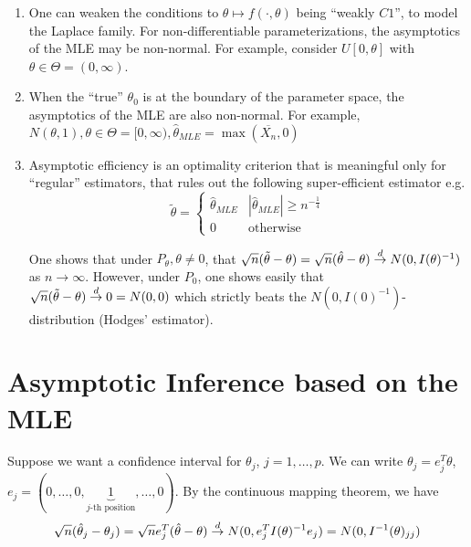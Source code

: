 
\begin{remark}
  \begin{enumerate}
  \item One can weaken the conditions to $\theta \mapsto f(\cdot,
    \theta)$ being ``weakly $C1$'', to model the Laplace family. For
    non-differentiable parameterizations, the asymptotics of the MLE
    may be non-normal. For example, consider $U[0, \theta]$ with
    $\theta \in \Theta = (0, \infty)$.
  \item When the ``true'' $\theta_{0}$ is at the boundary of the
    parameter space, the asymptotics of the MLE are also non-normal.
    For example, $N(\theta, 1), \theta \in \Theta = [0, \infty), \hat
    \theta_{MLE} = \max(\overline{X_{n}}, 0)$
  \item Asymptotic efficiency is an optimality criterion that is
    meaningful only for ``regular'' estimators, that rules out the
    following super-efficient estimator e.g.
    \begin{equation}
      \label{eq:67}
      \tilde \theta =
      \begin{cases}
        \hat \theta_{MLE} & |\hat \theta_{MLE}| \geq n^{-\frac{1}{4}} \\
        0 & \text{otherwise}
      \end{cases}
    \end{equation}

    One shows that under $P_{\theta}, \theta \neq 0$, that
    $\sqrt{n}(\tilde \theta - \theta) = \sqrt{n}(\hat \theta -
    \theta) \overset{d}{\rightarrow} N(0, I(\theta)^{-1})$ as $n \rightarrow \infty$.
    However, under $P_{0}$, one shows easily that $\sqrt{n}(\tilde
    \theta - \theta) \overset{d}{\rightarrow} 0 = N(0, 0)$ which strictly beats the $N(0,
    I(0)^{-1})$-distribution (Hodges' estimator).
  \end{enumerate}
\end{remark}


\section{Asymptotic Inference based on the MLE}
\label{sec:asmpt-infer-based}

Suppose we want a confidence interval for $\theta_{j}$, $j = 1, \dots,
p$.   We can write $\theta_{j} = e_{j}^{T} \theta$, $e_{j} = (0,
\dots, 0, \underbrace{1}_{\text{$j$-th position}}, \dots, 0)$.  By the
continuous mapping theorem, we have
\begin{align}
  \label{eq:68}
  \sqrt{n} (\hat \theta_{j} - \theta_{j}) = \sqrt{n} e_{j}^{T}(\hat
  \theta - \theta) \overset{d}{\rightarrow} N(0, e_{j}^{T} I(\theta)^{-1}e_{j}) = N(0, I^{-1}(\theta)_{jj})
\end{align}


